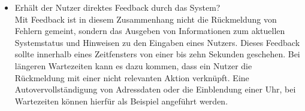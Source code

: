 \begin{description}
\begin{itemize}

\item Erhält der Nutzer direktes Feedback durch das System?\\
Mit Feedback ist in diesem Zusammenhang nicht die Rückmeldung von Fehlern gemeint, sondern das Ausgeben von Informationen zum aktuellen Systemstatus und Hinweisen zu den Eingaben eines Nutzers. Dieses Feedback sollte innerhalb eines Zeitfensters von einer bis zehn Sekunden geschehen. Bei längeren Wartezeiten kann es dazu kommen, dass ein Nutzer die Rückmeldung mit einer nicht relevanten Aktion verknüpft. Eine Autovervollständigung von Adressdaten oder die Einblendung einer Uhr, bei Wartezeiten können hierfür als Beispiel angeführt werden. %
\cite[S. 134 ff.]{Nielsen:1994vk}



\end{itemize}
\end{description}
